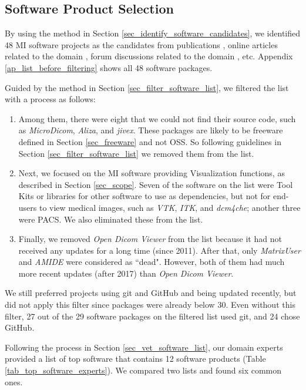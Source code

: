 \subsection{Software Product Selection}
\label{sec_mi_software_selection}
By using the method in Section \ref{sec_identify_software_candidates}, we identified 48 MI software projects as the candidates from publications \cite{Bjorn2017} \cite{Bruhschwein2019} \cite{Haak2015}, online articles related to the domain \cite{Emms2019} \cite{Hasan2020} \cite{Mu2019}, forum discussions related to the domain \cite{Samala2014}, etc. Appendix \ref{ap_list_before_filtering} shows all 48 software packages.

Guided by the method in Section \ref{sec_filter_software_list}, we filtered the list with a process as follows:

\begin{enumerate}
\item Among them, there were eight that we could not find their source code, such as \textit{MicroDicom}, \textit{Aliza}, and \textit{jivex}. These packages are likely to be freeware defined in Section \ref{sec_freeware} and not OSS. So following guidelines in Section \ref{sec_filter_software_list} we removed them from the list.

\item Next, we focused on the MI software providing Visualization functions, as described in Section \ref{sec_scope}. Seven of the software on the list were Tool Kits or libraries for other software to use as dependencies, but not for end-users to view medical images, such as \textit{VTK}, \textit{ITK}, and \textit{dcm4che}; another three were PACS. We also eliminated these from the list.

\item Finally, we removed \textit{Open Dicom Viewer} from the list because it had not received any updates for a long time (since 2011). After that, only \textit{MatrixUser} and \textit{AMIDE} were considered as ``dead". However, both of them had much more recent updates (after 2017) than \textit{Open Dicom Viewer}.
\end{enumerate}

We still preferred projects using git and GitHub and being updated recently, but did not apply this filter since packages were already below 30. Even without this filter, 27 out of the 29 software packages on the filtered list used git, and 24 chose GitHub.

Following the process in Section \ref{sec_vet_software_list}, our domain experts provided a list of top software that contains 12 software products (Table \ref{tab_top_software_experts}). We compared two lists and found six common ones.


